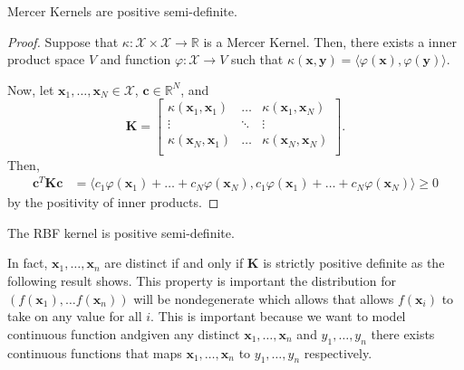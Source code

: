 \begin{lemma}
    Mercer Kernels are positive semi-definite.
\end{lemma}
\begin{proof}
    Suppose that $\kappa: \mathcal{X} \times \mathcal{X} \to \mathbb{R}$ is a Mercer Kernel.
    Then, there exists a inner product space $V$ and function $\varphi: \mathcal{X} \to V$ such that $\kappa(\mathbf{x}, \mathbf{y}) = \langle\varphi(\mathbf{x}), \varphi(\mathbf{y})\rangle$.

    Now, let $\mathbf{x}_1, \ldots, \mathbf{x}_N \in \mathcal{X}$, $\mathbf{c} \in \mathbb{R}^{N}$, and
    \begin{equation*}
        \mathbf{K} =
        \begin{bmatrix}
            \kappa(\mathbf{x}_1, \mathbf{x}_1) & \ldots & \kappa(\mathbf{x}_1, \mathbf{x}_N) \\
            \vdots & \ddots & \vdots \\
            \kappa(\mathbf{x}_N, \mathbf{x}_1) & \ldots & \kappa(\mathbf{x}_N, \mathbf{x}_N) \\
        \end{bmatrix}
        .
    \end{equation*}
    Then,
    \begin{align*}
        \mathbf{c}^{T} \mathbf{K} \mathbf{c}
        & = \langle c_1 \varphi(\mathbf{x}_1) + \ldots + c_N \varphi(\mathbf{x}_N), c_1 \varphi(\mathbf{x}_1) + \ldots + c_N \varphi(\mathbf{x}_N) \rangle
        \geq 0
    \end{align*}
    by the positivity of inner products.
\end{proof}

\begin{corollary}
    \label{corr:rbf-psd}
    The RBF kernel is positive semi-definite.
\end{corollary}

In fact, $\mathbf{x}_1, \ldots, \mathbf{x}_n$ are distinct if and only if $\mathbf{K}$ is strictly positive definite as the following result shows.
This property is important the distribution for $(f(\mathbf{x}_1), \ldots f(\mathbf{x}_n))$ will be nondegenerate which allows that allows $f(\mathbf{x}_i)$ to take on any value for all $i$.
This is important because we want to model continuous function andgiven any distinct $\mathbf{x}_1, \ldots, \mathbf{x}_n$ and $y_1, \ldots, y_n$ there exists continuous functions that maps $\mathbf{x}_1, \ldots, \mathbf{x}_n$ to $y_1, \ldots, y_n$ respectively.

